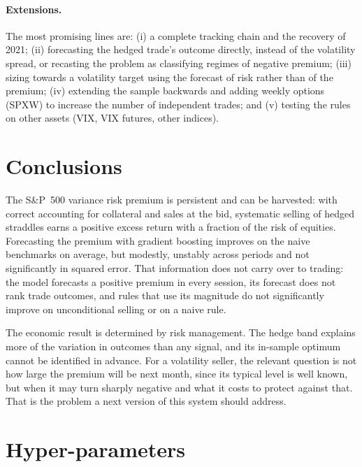 \documentclass[11pt,a4paper]{article}
\begin{document}
\paragraph{Extensions.} The most promising lines are: (i) a complete tracking chain and the recovery of 2021; (ii) forecasting the hedged trade's outcome directly, instead of the volatility spread, or recasting the problem as classifying regimes of negative premium; (iii) sizing towards a volatility target using the forecast of risk rather than of the premium; (iv) extending the sample backwards and adding weekly options (SPXW) to increase the number of independent trades; and (v) testing the rules on other assets (VIX, VIX futures, other indices).

\section{Conclusions}\label{sec:conclusions}

The S\&P~500 variance risk premium is persistent and can be harvested: with correct accounting for collateral and sales at the bid, systematic selling of hedged straddles earns a positive excess return with a fraction of the risk of equities. Forecasting the premium with gradient boosting improves on the naive benchmarks on average, but modestly, unstably across periods and not significantly in squared error. That information does not carry over to trading: the model forecasts a positive premium in every session, its forecast does not rank trade outcomes, and rules that use its magnitude do not significantly improve on unconditional selling or on a naive rule.

The economic result is determined by risk management. The hedge band explains more of the variation in outcomes than any signal, and its in-sample optimum cannot be identified in advance. For a volatility seller, the relevant question is not how large the premium will be next month, since its typical level is well known, but when it may turn sharply negative and what it costs to protect against that. That is the problem a next version of this system should address.

\FloatBarrier



\clearpage
\appendix
\section{Hyper-parameters}\label{app:hyper}
\end{document}
